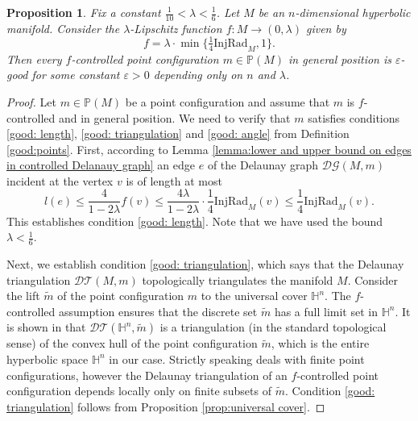 \documentclass{amsart}
\newcommand{\HH}{\mathbb{H}}
\newcommand{\Points}{\mathbb{P}}
\newcommand{\DelanGraph}{\mathcal{DG}}
\newcommand{\DelanComplex}{\mathcal{DT}}
\theoremstyle{plain}
\newtheorem{prop}[theorem]{Proposition}
\numberwithin{equation}{section}
\theoremstyle{definition}
\begin{document}
\begin{prop}
\label{prop:a Delanauy graph from a slowly varying controlled function is good}
Fix a constant $\frac{1}{10} < \lambda < \frac{1}{6}$. Let $M$ be an $n$-dimensional hyperbolic manifold. Consider the $\lambda$-Lipschitz function  $f : M \to \left(0,\lambda\right)$ given by 
$$
f = \lambda \cdot \min\{\tfrac{1}{4} \mathrm{InjRad}_M,1\}.
$$
Then every $f$-controlled point configuration $m \in \Points(M)$ in general position is $\varepsilon$-good for some constant $\varepsilon > 0$ depending only on $n$ and $\lambda$.
\end{prop}

\begin{proof}
Let $m \in \Points(M)$ be a point configuration and assume that $m$ is $f$-controlled and in general position. We need to verify that $m$ satisfies conditions \ref{good: length}, \ref{good: triangulation} and \ref{good: angle} from Definition \ref{good:points}.
First, according to Lemma \ref{lemma:lower and upper bound on edges in controlled Delanauy graph} an edge $e$ of the Delaunay graph $\DelanGraph(M,m)$ incident at the vertex $v$ is of length at most $$l(e) \le \frac{4}{1-2\lambda} f(v) \le \frac{4\lambda}{1-2\lambda}\cdot \frac{1}{4} \mathrm{InjRad}_M(v) \le \frac{1}{4} \mathrm{InjRad}_M(v).$$
This establishes condition \ref{good: length}. Note that we have used the bound $\lambda < \frac{1}{6}$.

Next, we establish condition \ref{good: triangulation}, which says that the Delaunay triangulation $\DelanComplex(M,m)$ topologically triangulates the manifold $M$. Consider the lift $\widetilde m$ of the point configuration $m$ to the universal cover $\mathbb H^n$. The $f$-controlled assumption ensures that  the discrete set $\widetilde m$ has a full limit set in $\mathbb H^n$. It is shown in \cite[Proposition 3.5]{deblois2018delaunay} that $\DelanComplex(\HH^n,\widetilde m)$ is a triangulation (in the standard topological sense) of the convex hull of the point configuration $\widetilde m $, which is the entire hyperbolic space $\HH^n$ in our case. Strictly speaking  \cite[\S3]{deblois2018delaunay} deals with finite point configurations, however the Delaunay triangulation of an $f$-controlled point configuration  depends locally only on finite subsets of $\widetilde m$. Condition \ref{good: triangulation} follows from Proposition \ref{prop:universal cover}.


\end{proof}
\end{document}
